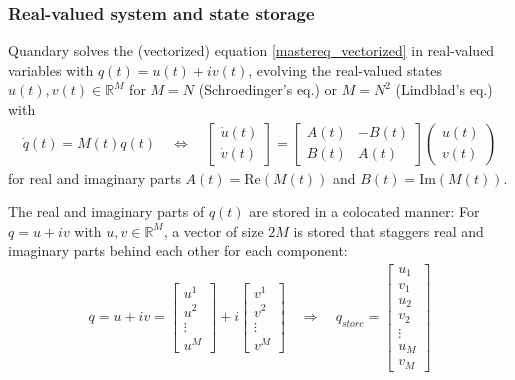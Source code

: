 \documentclass[11pt]{article}
\newcommand{\R}{\mathds{R}}
\begin{document}
  \subsubsection{Real-valued system and state storage}
   Quandary solves the (vectorized) equation \eqref{mastereq_vectorized} in
   real-valued variables with $q(t) = u(t) + iv(t)$, evolving the real-valued
   states $u(t), v(t)\in \R^{M}$ for $M=N$ (Schroedinger's eq.) or $M=N^2$ (Lindblad's eq.) with
   \begin{align}
     \dot q(t) = M(t) q(t) \quad \Leftrightarrow \quad \begin{bmatrix} \dot u(t) \\ \dot v(t) \end{bmatrix} = 
   \begin{bmatrix} A(t) & -B(t) \\ B(t) & A(t) \end{bmatrix} 
   \begin{pmatrix} u(t) \\ v(t) \end{pmatrix} 
   \label{realvaluedODE}
   \end{align}
   for real and imaginary parts $A(t) = \mbox{Re} \left(M(t)\right)$ and $B(t) = \mbox{Im}\left(M(t)\right)$. 

The real and imaginary parts of $q(t)$ are stored in a colocated manner: For
  $q = u+iv$ with $u,v\in\R^{M}$, a vector of size $2M$ is stored that
  staggers real and imaginary parts behind each other for each component:
  \begin{align*}
    q = u+iv = \begin{bmatrix}
     u^1\\u^2\\ \vdots \\ u^{M} 
    \end{bmatrix}
    + i \begin{bmatrix}
     v^1\\v^2\\ \vdots \\ v^{M} 
    \end{bmatrix}
    \quad \Rightarrow \quad
    q_{store} = \begin{bmatrix}
      u_1 \\ v_1\\ u_2 \\ v_2 \\ \vdots \\ u_{M} \\ v_{M}
    \end{bmatrix}
  \end{align*}
\end{document}
